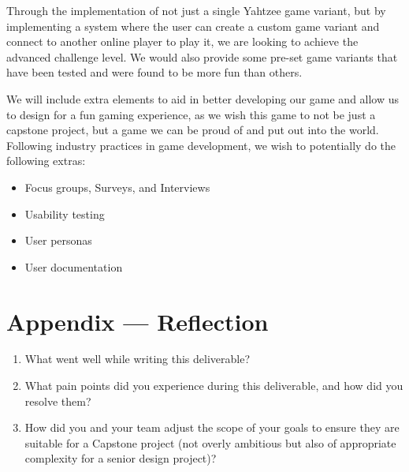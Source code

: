 \documentclass{article}
\begin{document}
Through the implementation of not just a single Yahtzee game variant, but by implementing a system where the user can create a custom game variant and connect to another online player to play it, we are looking to achieve the advanced challenge level. We would also provide some pre-set game variants that have been tested and were found to be more fun than others.

We will include extra elements to aid in better developing our game and allow us to design for a fun gaming experience, as we wish this game to not be just a capstone project, but a game we can be proud of and put out into the world. Following industry practices in game development, we wish to potentially do the following extras:

\begin{itemize}
	\item Focus groups, Surveys, and Interviews
	\item Usability testing
	\item User personas
	\item User documentation
\end{itemize}

\newpage{}

\section*{Appendix --- Reflection}




\begin{enumerate}
    \item What went well while writing this deliverable? 
    \item What pain points did you experience during this deliverable, and how
    did you resolve them?
    \item How did you and your team adjust the scope of your goals to ensure
    they are suitable for a Capstone project (not overly ambitious but also of
    appropriate complexity for a senior design project)?
\end{enumerate}  
\end{document}
